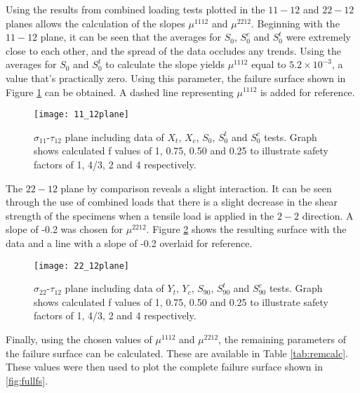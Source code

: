 \documentclass[main.tex]{subfiles}
\begin{document}
Using the results from combined loading tests plotted in the $11-12$ and $22-12$ planes allows the calculation of the slopes $\mu^{1112}$ and  $\mu^{2212}$. Beginning with the $11-12$ plane, it can be seen that the averages for $S_{0}$, $S_{0}^c$  and $S_{0}^t$ were extremely close to each other, and the spread of the data occludes any trends. Using the averages for $S_{0}$ and $S_{0}^t$ to calculate the slope yields $\mu^{1112}$ equal to $5.2\times 10^{-3}$, a value that's practically zero. Using this parameter, the failure surface shown in Figure \ref{fig:1112plane} can be obtained. A dashed line representing $\mu^{1112}$ is added for reference.

\pagebreak

\begin{figure}[!htbp]
	\center
	\texttt{[image: 11\_12plane]}
	\captionsetup{justification=centering} %
	\caption[failure envelope in the $\sigma_{11}$-$\tau_{12}$ plane]{$\sigma_{11}$-$\tau_{12}$ plane including data of $X_t$, $X_c$, $S_{0}$, $S_{0}^t$ and $S_{0}^c$ tests. Graph shows calculated f values of 1, 0.75, 0.50 and 0.25 to illustrate safety factors of 1, 4/3, 2 and 4 respectively.} \label{fig:1112plane}
\end{figure}

The $22-12$ plane by comparison reveals a slight interaction. It can be seen through the use of combined loads that there is a slight decrease in the shear strength of the specimens when a tensile load is applied in the $2-2$ direction. A slope of -0.2 was chosen for $\mu^{2212}$. Figure \ref{fig:2212plane} shows the resulting surface with the data and a line with a slope of -0.2 overlaid for reference.

\begin{figure}[!htbp]
	\center
	\texttt{[image: 22\_12plane]}
	\captionsetup{justification=centering} %
	\caption[failure envelope in the $\sigma_{22}$-$\tau_{12}$ plane]{$\sigma_{22}$-$\tau_{12}$ plane including data of $Y_t$, $Y_c$, $S_{90}$, $S_{90}^t$ and $S_{90}^c$ tests. Graph shows calculated f values of 1, 0.75, 0.50 and 0.25 to illustrate safety factors of 1, 4/3, 2 and 4 respectively.} \label{fig:2212plane}
\end{figure}

Finally, using the chosen values of $\mu^{1112}$ and $\mu^{2212}$, the remaining parameters of the failure surface can be calculated. These are available in Table \ref{tab:remcalc}. These values were then used to plot the complete failure surface shown in \ref{fig:fullfs}.
\end{document}
